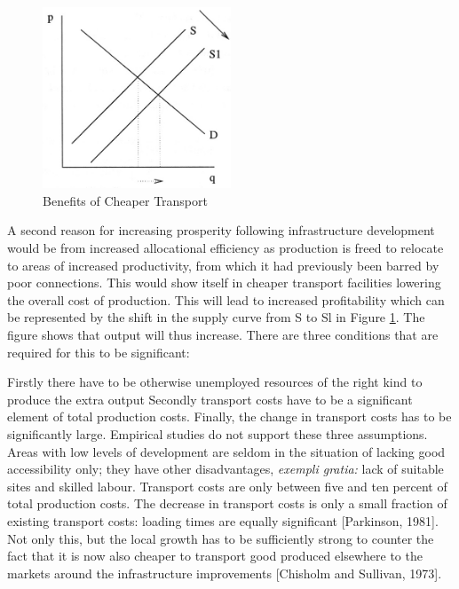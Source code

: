 \begin{figure}
  \centering
    \includegraphics[width=0.5\textwidth]{./diagrams/cheapertransport}
  \caption{Benefits of Cheaper Transport}
  \label{fig:cheaper_transport}
\end{figure}

A second reason for increasing prosperity following infrastructure development would be from increased allocational efficiency as production is freed to relocate to areas of increased productivity, from which it had previously been barred by poor connections. This would show itself in cheaper transport facilities lowering the overall cost of production. This will lead to increased profitability which can be represented by the shift in the supply curve from S to Sl in Figure \ref{fig:cheaper_transport}. The figure shows that output will thus increase. There are three conditions that are required for this to be significant:

Firstly there have to be otherwise unemployed resources of the right kind to produce the extra output Secondly transport costs have to be a significant element of total production costs. Finally, the change in transport costs has to be significantly large. Empirical studies do not support these three assumptions. Areas with low levels of development are seldom in the situation of lacking good accessibility only; they have other disadvantages, \textit{exempli gratia:} lack of suitable sites and skilled labour. Transport costs are only between five and ten percent of total production costs. The decrease in transport costs is only a small fraction of existing transport costs: loading times are equally significant [Parkinson, 1981]. Not only this, but the local growth has to be sufficiently strong to counter the fact that it is now also cheaper to transport good produced elsewhere to the markets around the infrastructure improvements [Chisholm and Sullivan, 1973].

